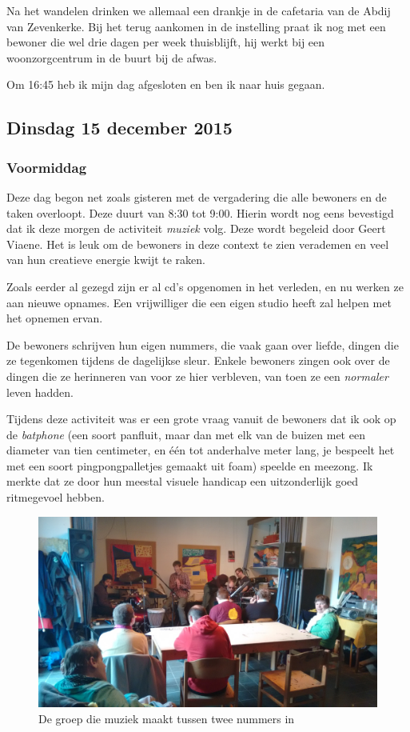 \documentclass[a4paper,12pt]{article}
\begin{document}
Na het wandelen drinken we allemaal een drankje in de cafetaria van de Abdij van Zevenkerke. Bij het terug aankomen in de instelling praat ik nog met een bewoner die wel drie dagen per week thuisblijft, hij werkt bij een woonzorgcentrum in de buurt bij de afwas.

Om 16:45 heb ik mijn dag afgesloten en ben ik naar huis gegaan.

\subsection{Dinsdag 15 december 2015}

\subsubsection{Voormiddag}

Deze dag begon net zoals gisteren met de vergadering die alle bewoners en de taken overloopt. Deze duurt van 8:30 tot 9:00. Hierin wordt nog eens bevestigd dat ik deze morgen de activiteit \emph{muziek} volg. Deze wordt begeleid door Geert Viaene. Het is leuk om de bewoners in deze context te zien verademen en veel van hun creatieve energie kwijt te raken.

Zoals eerder al gezegd zijn er al cd's opgenomen in het verleden, en nu werken ze aan nieuwe opnames. Een vrijwilliger die een eigen studio heeft zal helpen met het opnemen ervan.

De bewoners schrijven hun eigen nummers, die vaak gaan over liefde, dingen die ze tegenkomen tijdens de dagelijkse sleur. Enkele bewoners zingen ook over de dingen die ze herinneren van voor ze hier verbleven, van toen ze een \emph{normaler} leven hadden.

Tijdens deze activiteit was er een grote vraag vanuit de bewoners dat ik ook op de \emph{batphone} (een soort panfluit, maar dan met elk van de buizen met een diameter van tien centimeter, en één tot anderhalve meter lang, je bespeelt het met een soort pingpongpalletjes gemaakt uit foam) speelde en meezong. Ik merkte dat ze door hun meestal visuele handicap een uitzonderlijk goed ritmegevoel hebben.

\begin{figure}[H]
  \centering
  \includegraphics[width=\textwidth]{./muziek.jpg}
  \caption{De groep die muziek maakt tussen twee nummers in}
\end{figure}
\end{document}
